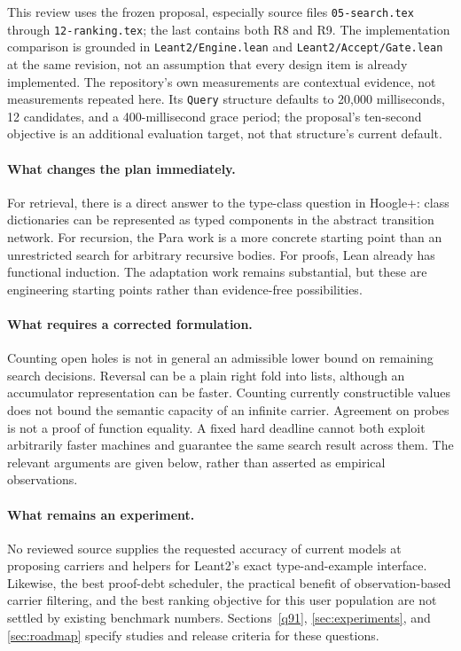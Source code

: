 \documentclass[11pt,a4paper]{article}
\newcommand{\code}[1]{\nolinkurl{#1}}
\theoremstyle{remark}
\begin{document}
This review uses the frozen proposal, especially source files \code{05-search.tex} through \code{12-ranking.tex}; the last contains both R8 and R9. The implementation comparison is grounded in \code{Leant2/Engine.lean} and \code{Leant2/Accept/Gate.lean} at the same revision, not an assumption that every design item is already implemented. The repository's own measurements are contextual evidence, not measurements repeated here. Its \code{Query} structure defaults to 20,000 milliseconds, 12 candidates, and a 400-millisecond grace period; the proposal's ten-second objective is an additional evaluation target, not that structure's current default.~\cite{repo,engine,gate}

\paragraph{What changes the plan immediately.}
For retrieval, there is a direct answer to the type-class question in Hoogle+: class dictionaries can be represented as typed components in the abstract transition network. For recursion, the Para work is a more concrete starting point than an unrestricted search for arbitrary recursive bodies. For proofs, Lean already has functional induction. The adaptation work remains substantial, but these are engineering starting points rather than evidence-free possibilities.~\cite{hoogle,para,lean418}

\paragraph{What requires a corrected formulation.}
Counting open holes is not in general an admissible lower bound on remaining search decisions. Reversal can be a plain right fold into lists, although an accumulator representation can be faster. Counting currently constructible values does not bound the semantic capacity of an infinite carrier. Agreement on probes is not a proof of function equality. A fixed hard deadline cannot both exploit arbitrarily faster machines and guarantee the same search result across them. The relevant arguments are given below, rather than asserted as empirical observations.

\paragraph{What remains an experiment.}
No reviewed source supplies the requested accuracy of current models at proposing carriers and helpers for Leant2's exact type-and-example interface. Likewise, the best proof-debt scheduler, the practical benefit of observation-based carrier filtering, and the best ranking objective for this user population are not settled by existing benchmark numbers. Sections~\ref{q91}, \ref{sec:experiments}, and \ref{sec:roadmap} specify studies and release criteria for these questions.
\end{document}
